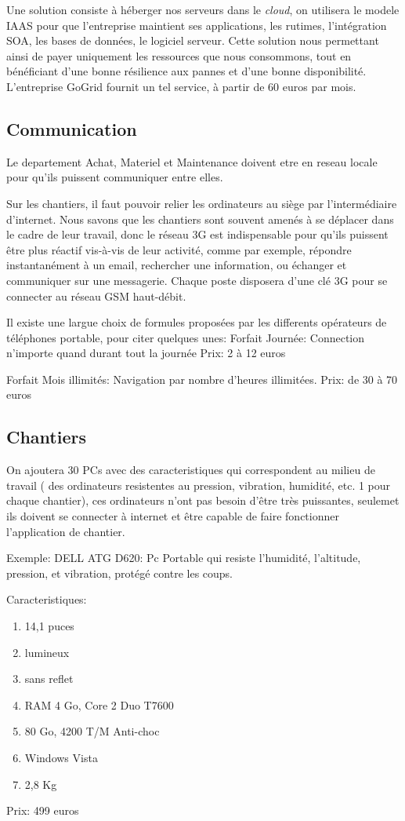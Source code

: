 \documentclass[a4paper]{article}
\begin{document}
Une solution consiste à héberger nos serveurs dans le \textsl{cloud}, on utilisera le modele IAAS pour  que l'entreprise 
maintient ses applications, les rutimes, l'intégration SOA, les bases de données, le logiciel serveur.
Cette solution nous permettant ainsi de payer uniquement les ressources que nous consommons, tout en bénéficiant 
d'une bonne résilience aux pannes et d'une bonne disponibilité.
L'entreprise GoGrid fournit un tel service, à partir de 60 euros par mois.


\subsection{Communication}
Le departement Achat, Materiel et Maintenance doivent etre en reseau locale pour qu'ils puissent  communiquer entre elles.

Sur les chantiers, il faut pouvoir relier les ordinateurs au siège par l’intermédiaire d’internet. 
Nous savons que les chantiers
 sont souvent amenés à se déplacer dans le cadre de leur travail, donc le réseau 3G est indispensable 
pour qu'ils puissent être plus réactif vis-à-vis de leur activité, comme par exemple, répondre 
instantanément à un email, rechercher une information, ou échanger et communiquer sur une messagerie. 
Chaque poste disposera d’une clé 3G pour se connecter au réseau GSM haut-débit.

Il existe une largue choix de formules proposées par les differents opérateurs de téléphones portable, 
pour citer quelques unes:
Forfait Journée: Connection n'importe quand durant tout la journée
Prix: 2 à 12 euros

Forfait Mois illimités: Navigation par nombre d'heures illimitées.
Prix: de 30 à 70 euros


   

\subsection{Chantiers}
On ajoutera 30 PCs avec des caracteristiques qui correspondent au milieu de travail ( des ordinateurs resistentes 
au pression, vibration, humidité, etc. 1 pour chaque chantier), ces ordinateurs n'ont pas besoin d’être très puissantes, 
seulemet ils doivent se connecter à internet et être capable de faire fonctionner l’application de chantier.

Exemple:
DELL ATG D620: Pc Portable qui resiste l'humidité, l'altitude, pression, et vibration, protégé 
contre les coups.
	
	Caracteristiques:

	\begin{enumerate}
		\item 14,1 puces
		\item lumineux
		\item sans reflet
		\item RAM 4 Go, Core 2 Duo T7600
		\item 80 Go, 4200 T/M Anti-choc
		\item Windows Vista
		\item 2,8 Kg
	\end{enumerate}

Prix: 499 euros
\end{document}
